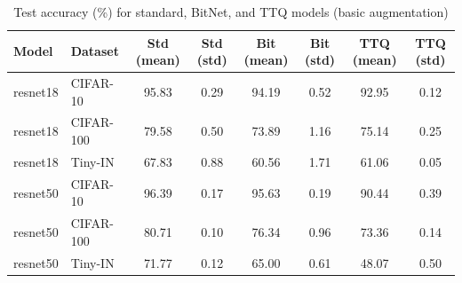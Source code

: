 \begin{table}[h]
\centering
\caption{Test accuracy (\%) for standard, BitNet, and TTQ models (basic augmentation)}
\label{tab:accuracy_basic}
\begin{tabular}{llcccccc}
\toprule
Model & Dataset & Std (mean) & Std (std) & Bit (mean) & Bit (std) & TTQ (mean) & TTQ (std) \\
\midrule
resnet18 & CIFAR-10 & 95.83 & 0.29 & 94.19 & 0.52 & 92.95 & 0.12 \\
resnet18 & CIFAR-100 & 79.58 & 0.50 & 73.89 & 1.16 & 75.14 & 0.25 \\
resnet18 & Tiny-IN & 67.83 & 0.88 & 60.56 & 1.71 & 61.06 & 0.05 \\
resnet50 & CIFAR-10 & 96.39 & 0.17 & 95.63 & 0.19 & 90.44 & 0.39 \\
resnet50 & CIFAR-100 & 80.71 & 0.10 & 76.34 & 0.96 & 73.36 & 0.14 \\
resnet50 & Tiny-IN & 71.77 & 0.12 & 65.00 & 0.61 & 48.07 & 0.50 \\
\bottomrule
\end{tabular}
\end{table}